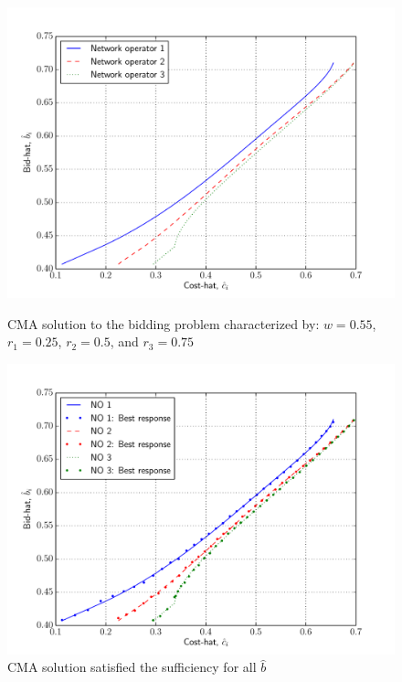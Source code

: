 \begin{figure}[p!]
  \includegraphics[width=\figsize]{Indirect/Figures/combined_3}
  \caption{CMA solution to the bidding problem characterized by: $w=0.55$, $r_1 = 0.25$, $r_2 = 0.5$, and $r_3 = 0.75$}
  \label{fig:combined_3_indirect}
  \vspace{10mm}
  \includegraphics[width=\figsize]{Indirect/Figures/combined_3_sufficiency}
  \caption{CMA solution satisfied the sufficiency for all $\hat{b}$}
  \label{fig:combined_3_sufficiency_indirect}
\end{figure}

